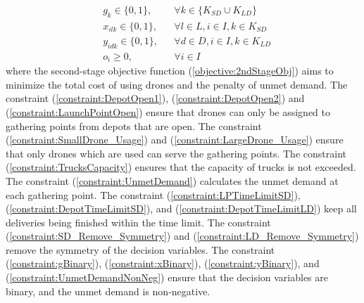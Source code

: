 \documentclass[preprint,review,11pt,authoryear]{elsarticle}
\begin{document}
\begin{subequations}
\begin{align}
                                      & g_k \in \{0,1\}, && \forall k \in \{K_{SD} \cup K_{LD}\} \label{constraint:gBinary} \\
                                      & x_{ilk} \in \{0,1\}, && \forall l \in L, i \in I, k \in K_{SD} \label{constraint:xBinary} \\
                                      & y_{idk} \in \{0,1\}, && \forall d \in D, i \in I, k \in K_{LD} \label{constraint:yBinary} \\
                                      & o_i \geq 0, && \forall i \in I \label{constraint:UnmetDemandNonNeg}
    \end{align}
\end{subequations}
\normalsize
where the second-stage objective function (\ref{objective:2ndStageObj}) aims to minimize the total cost of using drones and the penalty of unmet demand. The constraint (\ref{constraint:DepotOpen1}), (\ref{constraint:DepotOpen2}) and (\ref{constraint:LaunchPointOpen}) ensure that drones can only be assigned to gathering points from depots that are open. The constraint (\ref{constraint:SmallDrone_Usage}) and (\ref{constraint:LargeDrone_Usage}) ensure that only drones which are used can serve the gathering points. The constraint (\ref{constraint:TrucksCapacity}) ensures that the capacity of trucks is not exceeded. The constraint (\ref{constraint:UnmetDemand}) calculates the unmet demand at each gathering point. The constraint (\ref{constraint:LPTimeLimitSD}), (\ref{constraint:DepotTimeLimitSD}), and (\ref{constraint:DepotTimeLimitLD}) keep all deliveries being finished within the time limit. The constraint (\ref{constraint:SD_Remove_Symmetry}) and (\ref{constraint:LD_Remove_Symmetry}) remove the symmetry of the decision variables. The constraint (\ref{constraint:gBinary}), (\ref{constraint:xBinary}), (\ref{constraint:yBinary}), and (\ref{constraint:UnmetDemandNonNeg}) ensure that the decision variables are binary, and the unmet demand is non-negative.
\end{document}
